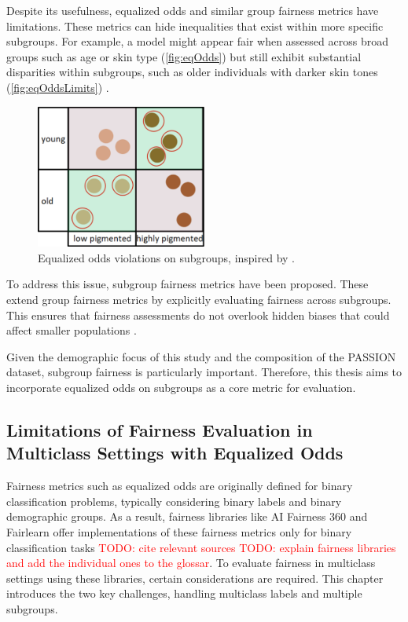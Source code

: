 \documentclass[12pt, a4paper, oneside]{book}   	%
\renewcommand{\todo}[1]{\textcolor{red}{TODO: #1}}
\begin{document}
		Despite its usefulness, equalized odds and similar group fairness metrics have limitations. These metrics can hide inequalities that exist within more specific subgroups. For example, a model might appear fair when assessed across broad groups such as age or skin type (\autoref{fig:eqOdds}) but still exhibit substantial disparities within subgroups, such as older individuals with darker skin tones (\autoref{fig:eqOddsLimits}) \autocite{M79_Kearns_2018,M80_Kearns_2019}.
		
		\begin{figure}[H]
			\centering
			\includegraphics[width=0.5\textwidth]{figures/EqualizedOddsSubgroupsIssueIllustration.png}
			\caption{Equalized odds violations on subgroups, inspired by \autocite{M80_Kearns_2019}.}
			\label{fig:eqOddsLimits}
		\end{figure}
		
		To address this issue, subgroup fairness metrics have been proposed. These extend group fairness metrics by explicitly evaluating fairness across subgroups. This ensures that fairness assessments do not overlook hidden biases that could affect smaller populations \autocite{M79_Kearns_2018,M80_Kearns_2019}.
		
		Given the demographic focus of this study and the composition of the PASSION dataset, subgroup fairness is particularly important. Therefore, this thesis aims to incorporate equalized odds on subgroups as a core metric for evaluation.
		
		
		\subsection{Limitations of Fairness Evaluation in Multiclass Settings with Equalized Odds}
		Fairness metrics such as equalized odds are originally defined for binary classification problems, typically considering binary labels and binary demographic groups. As a result, fairness libraries like AI Fairness 360 and Fairlearn offer implementations of these fairness metrics only for binary classification tasks \todo{cite relevant sources} \todo{explain fairness libraries and add the individual ones to the glossar}. To evaluate fairness in multiclass settings using these libraries, certain considerations are required. This chapter introduces the two key challenges, handling multiclass labels and multiple subgroups.		
		
\end{document}
